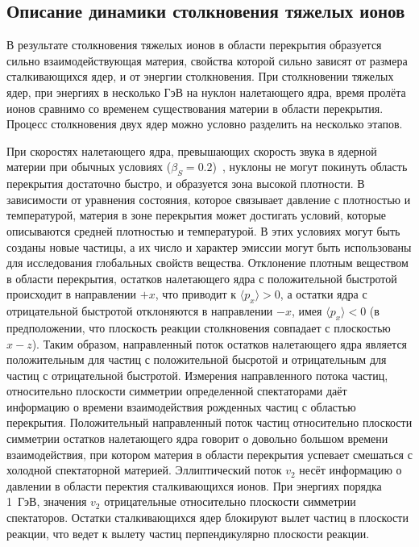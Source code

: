 \subsection{Описание динамики столкновения тяжелых ионов}


В результате столкновения тяжелых ионов в области перекрытия образуется сильно взаимодействующая материя, свойства которой сильно зависят от размера сталкивающихся ядер, и от энергии столкновения.
При столкновении тяжелых ядер, при энергиях в несколько ГэВ на нуклон налетающего ядра, время пролёта ионов сравнимо со временем существования материи в области перекрытия.
Процесс столкновения двух ядер можно условно разделить на несколько этапов.

При скоростях налетающего ядра, превышающих скорость звука в ядерной материи при обычных условиях ($\beta_S=0.2$)~\cite{Weber:1998aa}, нуклоны не могут покинуть область перекрытия достаточно быстро, и образуется зона высокой плотности.
В зависимости от уравнения состояния, которое связывает давление с плотностью и температурой, материя в зоне перекрытия может достигать условий, которые описываются средней плотностью и температурой.
В этих условиях могут быть созданы новые частицы, а их число и характер эмиссии могут быть использованы для исследования глобальных свойств вещества.
Отклонение плотным веществом в области перекрытия, остатков налетающего ядра с положительной быстротой происходит в направлении $+x$, что приводит к $\langle p_x \rangle  > 0$, а остатки ядра с отрицательной быстротой отклоняются в направлении $-x$, имея $\langle p_x \rangle < 0$ (в предположении, что плоскость реакции столкновения совпадает с плоскостью $x-z$).
Таким образом, направленный поток остатков налетающего ядра является положительным для частиц с положительной бысротой и отрицательным для частиц с отрицательной быстротой.
Измерения направленного потока частиц, относительно плоскости симметрии определенной спектаторами даёт информацию о времени взаимодействия рожденных частиц с областью перекрытия.
Положительный направленный поток частиц относительно плоскости симметрии остатков налетающего ядра говорит о довольно большом времени взаимодействия, при котором материя в области перекрытия успевает смешаться с холодной спектаторной материей.
Эллиптический поток $v_2$ несёт информацию о давлении в области перектия сталкивающихся ионов.
При энергиях порядка 1~ГэВ, значения $v_2$ отрицательные относительно плоскости симметрии спектаторов.
Остатки сталкивающихся ядер блокируют вылет частиц в плоскости реакции, что ведет к вылету частиц перпендикулярно плоскости реакции.
